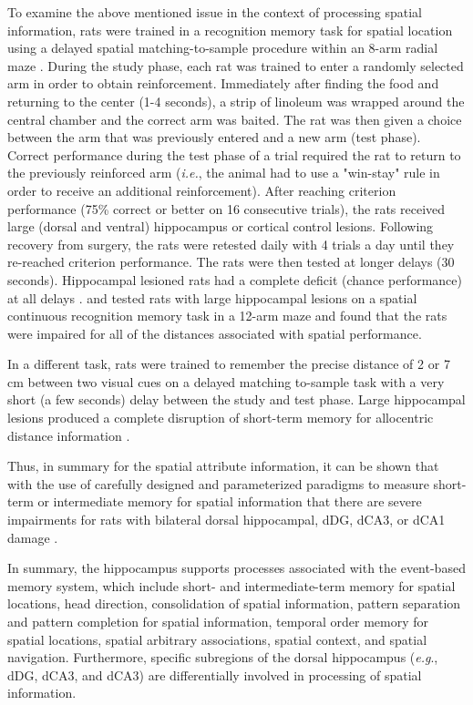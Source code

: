 \documentclass[doc, longtable]{apa6}
\begin{document}
To examine the above mentioned issue in the context of processing spatial information, rats were trained in a recognition memory task for spatial location using a delayed spatial matching-to-sample procedure within an 8-arm radial maze \parencite{Kesner1993a}. During the study phase, each rat was trained to enter a randomly selected arm in order to obtain reinforcement. Immediately after finding the food and returning to the center (1-4 seconds), a strip of linoleum was wrapped around the central chamber and the correct arm was baited. The rat was then given a choice between the arm that was previously entered and a new arm (test phase). Correct performance during the test phase of a trial required the rat to return to the previously reinforced arm (\textit{i.e.}, the animal had to use a "win-stay" rule in order to receive an additional reinforcement). After reaching criterion performance (75\% correct or better on 16 consecutive trials), the rats received large (dorsal and ventral) hippocampus or cortical control lesions. Following recovery from surgery, the rats were retested daily with 4 trials a day until they re-reached criterion performance. The rats were then tested at longer delays (30 seconds). Hippocampal lesioned rats had a complete deficit (chance performance) at all delays \parencite{Kesner1993a}. \textcite{Jackson-Smith1993a} and \textcite{Chiba1994a} tested rats with large hippocampal lesions on a spatial continuous recognition memory task in a 12-arm maze and found that the rats were impaired for all of the distances associated with spatial performance. 

In a different task, rats were trained to remember the precise distance of 2 or 7 cm between two visual cues on a delayed matching to-sample task with a very short (a few seconds) delay between the study and test phase. Large hippocampal lesions produced a complete disruption of short-term memory for allocentric distance information \parencite{Long1996a}.

Thus, in summary for the spatial attribute information, it can be shown that with the use of carefully designed and parameterized paradigms to measure short-term or intermediate memory for spatial information that there are severe impairments for rats with bilateral dorsal hippocampal, dDG, dCA3, or dCA1 damage \parencite{Kesner1990c, Kesner2013e, Kesner2013a, Kesner2013d,Kesner2013, Olton1983a, Rolls2006b}.

In summary, the hippocampus supports processes associated with the event-based memory system, which include short- and intermediate-term memory for spatial locations, head direction, consolidation of spatial information, pattern separation and pattern completion for spatial information, temporal order memory for spatial locations, spatial arbitrary associations, spatial context, and spatial navigation. Furthermore, specific subregions of the dorsal hippocampus (\textit{e.g}., dDG, dCA3, and dCA3) are differentially involved in processing of spatial information. 
\end{document}
